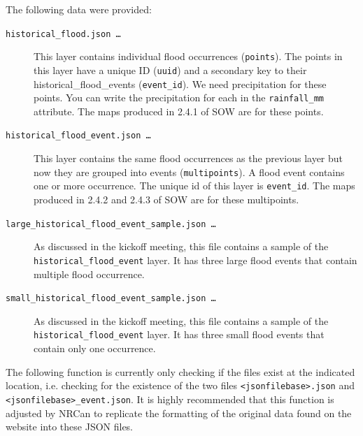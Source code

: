 \documentclass[10pt,a4paper,titlepage,parskip]{scrartcl}
\begin{document}
The following data were provided:
\begin{description}
	\item[\texttt{historical\_flood.json \ldots}] This layer contains individual flood
	occurrences (\texttt{points}). The points in this layer have a unique ID
	(\texttt{uuid}) and a secondary key to their historical\_flood\_events
	(\texttt{event\_id}). We need precipitation for these points. You can
	write the precipitation for each in the \texttt{rainfall\_mm}
	attribute. The maps produced in 2.4.1 of SOW are for these points.
	\item[\texttt{historical\_flood\_event.json \ldots}] This layer contains the same
	flood occurrences as the previous layer but now they are grouped
	into events (\texttt{multipoints}). A flood event contains one or more
	occurrence. The unique id of this layer is \texttt{event\_id}. The maps
	produced in 2.4.2 and 2.4.3 of SOW are for these multipoints.
	\item[\texttt{large\_historical\_flood\_event\_sample.json \ldots}] As discussed in the
	kickoff meeting, this file contains a sample of the
	\texttt{historical\_flood\_event} layer. It has three large flood events
	that contain multiple flood occurrence.
	\item[\texttt{small\_historical\_flood\_event\_sample.json \ldots}] As discussed in the
	kickoff meeting, this file contains a sample of the
	\texttt{historical\_flood\_event} layer. It has three small flood events
	that contain only one occurrence.
\end{description}

The following function is currently only checking if the files exist at the indicated location, i.e. checking for the existence of the two files \texttt{\textless{}jsonfilebase\textgreater{}.json} and \texttt{\textless{}jsonfilebase\textgreater{}\_event.json}. It is highly recommended that this function is adjusted by NRCan to replicate the formatting of the original data found on the website into these JSON files.
\end{document}
